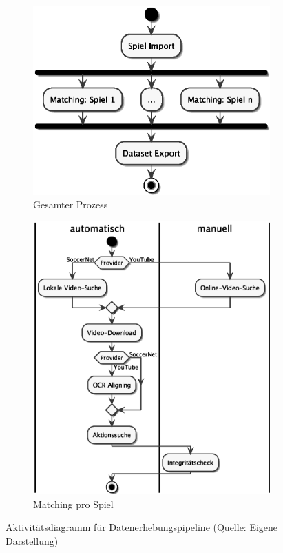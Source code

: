 \begin{figure}
    \centering
    \begin{subfigure}[b]{.5\textwidth}
        \centering
        \includegraphics[width=.8\linewidth]{fig/collection.eps}
        \caption{Gesamter Prozess}
        \label{fig:collection-pipeline_a}
    \end{subfigure}%
    \hfill
    \begin{subfigure}[b]{.5\textwidth}
        \centering
        \includegraphics[width=.95\linewidth]{fig/collection-pipeline.eps}
        \caption{Matching pro Spiel}
        \label{fig:collection-pipeline_b}
    \end{subfigure}
    \caption[Aktivitätsdiagramm für Datenerhebungspipeline]{Aktivitätsdiagramm für Datenerhebungspipeline (Quelle: Eigene Darstellung)}
    \label{fig:collection-pipeline}
\end{figure}

